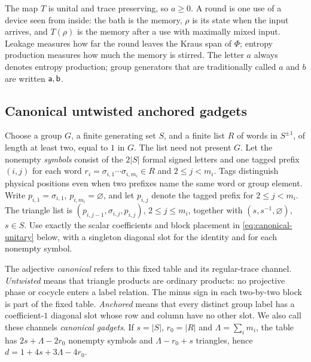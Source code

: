 The map $T$ is unital and trace preserving, so $a\ge0$. A round is one use of a device seen from inside: the bath is the memory, $\rho$ is its
state when the input arrives, and $T(\rho)$ is the memory after a use with maximally mixed input. Leakage measures how far the round leaves
the Kraus span of $\Phi$; entropy production measures how much the memory is stirred. The letter $a$ always denotes entropy production; group
generators that are traditionally called $a$ and $b$ are written $\mathsf a,\mathsf b$.

\subsection{Canonical untwisted anchored gadgets}\label{sec:gadgets}

\begin{definition}\label{def:canonical-gadget}
Choose a group $G$, a finite generating set $S$, and a finite list
$R$ of words in $S^{\pm1}$, of length at least two, equal to $1$ in
$G$. The list need not present $G$. Let the nonempty \emph{symbols} consist of the $2|S|$ formal
signed letters and one tagged prefix $(i,j)$ for each word
$r_i=\sigma_{i,1}\cdots\sigma_{i,m_i}\in R$ and
$2\leq j<m_i$. Tags distinguish physical positions even when
two prefixes name the same word or group element. Write
$p_{i,1}=\sigma_{i,1}$, $p_{i,m_i}=\varnothing$, and let
$p_{i,j}$ denote the tagged prefix for $2\leq j<m_i$.
The triangle list is
$(p_{i,j-1},\sigma_{i,j},p_{i,j})$, $2\leq j\leq m_i$,
together with $(s,s^{-1},\varnothing)$, $s\in S$.
Use exactly the scalar coefficients and block placement in
\eqref{eq:canonical-unitary} below, with a singleton diagonal
slot for the identity and for each nonempty symbol.

The adjective \emph{canonical} refers to this fixed table and its
regular-trace channel. \emph{Untwisted} means that triangle products
are ordinary products: no projective phase or cocycle enters a
label relation. The minus sign in each two-by-two block is part of
the fixed table. \emph{Anchored} means that every distinct group
label has a coefficient-$1$ diagonal slot whose row and column
have no other slot. We also call these channels \emph{canonical gadgets}.
If $s=|S|$, $r_0=|R|$ and $\Lambda=\sum_i m_i$, the table has
$2s+\Lambda-2r_0$ nonempty symbols and
$\Lambda-r_0+s$ triangles, hence
$d=1+4s+3\Lambda-4r_0$.
\end{definition}

